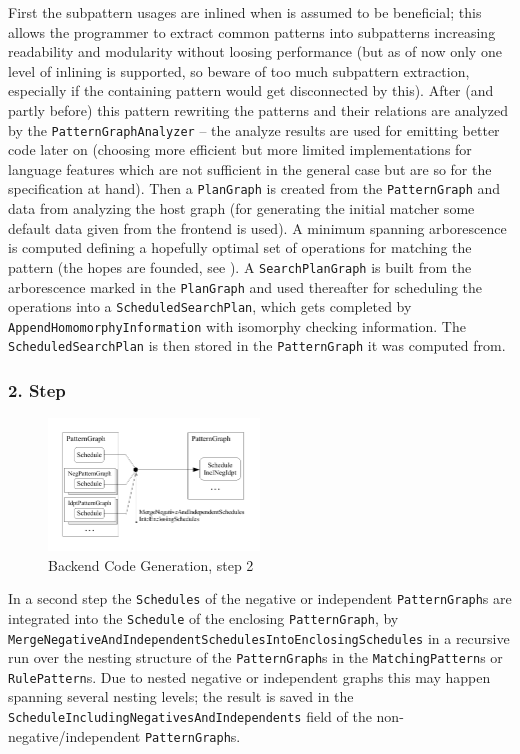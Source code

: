 First the subpattern usages are inlined when  is assumed to be beneficial; this allows the programmer to extract common patterns into subpatterns increasing readability and modularity without loosing performance (but as of now only one level of inlining is supported, so beware of too much subpattern extraction, especially if the containing pattern would get disconnected by this). 
After (and partly before) this pattern rewriting the patterns and their relations are analyzed by the \texttt{PatternGraphAnalyzer} -- the analyze results are used for emitting better code later on (choosing more efficient but more limited implementations for language features which are not sufficient in the general case but are so for the specification at hand).
Then a \texttt{PlanGraph} is created from the \texttt{PatternGraph} and data from analyzing the host graph (for generating the initial matcher some default data given from the frontend is used).
A minimum spanning arborescence is computed defining a hopefully optimal set of operations for matching the pattern (the hopes are founded, see \cite{BKG:07}).
A \texttt{SearchPlanGraph} is built from the arborescence marked in the \texttt{PlanGraph} and used thereafter for scheduling the operations into a \texttt{ScheduledSearchPlan}, which gets completed by \texttt{Append\-Homomorphy\-Information} with isomorphy checking information.
The \texttt{ScheduledSearchPlan} is then stored in the \texttt{PatternGraph} it was computed from.


\subsubsection*{2. Step}

\begin{figure}[htbp]
  \centering
  \includegraphics[width=0.5\textwidth]{fig/AblaufCodeerzeugungBackend2}
  \caption{Backend Code Generation, step 2}
  \label{figbackendcodegen2}
\end{figure}

In a second step the \texttt{Schedules} of the negative or independent \texttt{Pattern\-Graph}s are integrated into the \texttt{Schedule} of the enclosing \texttt{Pattern\-Graph}, by \texttt{Merge\-Negative\-And\-Independent\-Schedules\-Into\-Enclosing\-Schedules} in a recursive run over the nesting structure of the \texttt{Pattern\-Graph}s in the \texttt{Matching\-Pattern}s or \texttt{Rule\-Pattern}s.
Due to nested negative or independent graphs this may happen spanning several nesting levels;
the result is saved in the \texttt{Schedule\-Including\-Negatives\-And\-Independents} field of the non-negative/independent \texttt{Pattern\-Graph}s.


